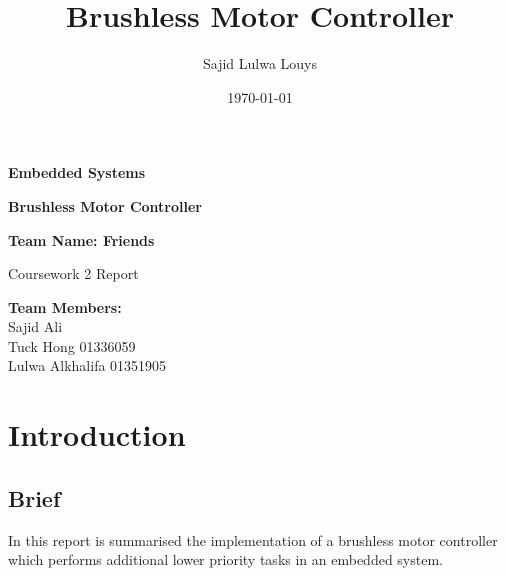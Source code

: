 \documentclass{article}
\title{Brushless Motor Controller}
\author{Sajid Lulwa Louys}
\date{\today}
\begin{document}
\begin{titlepage}
    \begin{center}
        \vspace*{1cm}

        \Huge
        \textbf{Embedded Systems}

        \vspace{0.5cm}
        \LARGE
        \textbf{Brushless Motor Controller}

        \vspace{1.5cm}

        \textbf{Team Name: Friends}\\

        \vfill

        Coursework 2 Report\\


        \vspace{0.8cm}


        \Large
        \textbf{Team Members:}\\
        Sajid Ali\\
        Tuck Hong 01336059\\
        Lulwa Alkhalifa 01351905 \\

    \end{center}
\end{titlepage}


\tableofcontents
\thispagestyle{empty} %
\clearpage

\setcounter{page}{1}

\section{Introduction}
\subsection{Brief}
In this report is summarised the implementation of a brushless motor controller which performs additional lower priority tasks in an embedded system.
\end{document}
